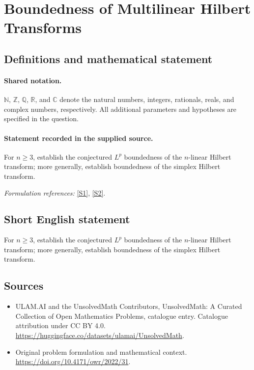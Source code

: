 \documentclass[11pt]{article}
\newcommand{\sref}[2]{\hyperlink{source:#1:#2}{[S#2]}}
\begin{document}
\section{Boundedness of Multilinear Hilbert Transforms}\label{statement}

\subsection{Definitions and mathematical statement}

\paragraph{Shared notation.}$\mathbb N$, $\mathbb Z$, $\mathbb Q$, $\mathbb R$, and $\mathbb C$ denote the natural numbers, integers, rationals, reals, and complex numbers, respectively. All additional parameters and hypotheses are specified in the question.


\paragraph{Statement recorded in the supplied source.}
For $n\geq3$, establish the conjectured $L^p$ boundedness of the $n$-linear Hilbert transform; more generally, establish boundedness of the simplex Hilbert transform.
\par\smallskip\textit{Formulation references:} \sref{statement}{1}, \sref{statement}{2}.
\subsection{Short English statement}
For $n\geq3$, establish the conjectured $L^p$ boundedness of the $n$-linear Hilbert transform; more generally, establish boundedness of the simplex Hilbert transform.
\subsection{Sources}
\begin{itemize}
\item[\hypertarget{source:statement:1}{S1}] ULAM.AI and the UnsolvedMath Contributors, UnsolvedMath: A Curated Collection of Open Mathematics Problems, catalogue entry. Catalogue attribution under CC BY 4.0.
\url{https://huggingface.co/datasets/ulamai/UnsolvedMath}.
\item[\hypertarget{source:statement:2}{S2}] Original problem formulation and mathematical context.
\url{https://doi.org/10.4171/owr/2022/31}.
\end{itemize}
\label{end:statement}
\end{document}
